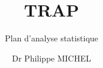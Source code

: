 \documentclass[
  a4paper,
  french]{scrreprt}
\title{TRAP}
\subtitle{Plan d'analyse statistique}
\author{Dr Philippe MICHEL}
\date{}
\begin{document}


\begin{titlepage}


\newcommand{\titlepagepagealign}{
\ifthenelse{\equal{left}{right}}{\raggedleft}{}
\ifthenelse{\equal{left}{center}}{\centering}{}
\ifthenelse{\equal{left}{left}}{\raggedright}{}
}


\newcommand{\titleandsubtitle}{
{\textcolor{novo}{\Huge{\bfseries{\nohyphens{TRAP}}}}\par
}%

\vspace{\betweentitlesubtitle}
{
\textcolor{novo}{\huge{\nohyphens{Plan d'analyse statistique}}}\par
}}
\newcommand{\titlepagetitleblock}{
\titleandsubtitle
}

\newcommand{\authorstyle}[1]{{\large{#1}}}

\newcommand{\affiliationstyle}[1]{{\large{#1}}}

\newcommand{\titlepageauthorblock}{
{\authorstyle{\nohyphens{Dr Philippe MICHEL}{\textsuperscript{1}}}}}

\newcommand{\titlepageaffiliationblock}{
\hangindent=1em
\hangafter=1
{\affiliationstyle{
{1}.~Hôpital NOVO,~Unité de Soutien à la Recherche Clinique


\vspace{1\baselineskip} 
}}
}
\newcommand{\headerstyled}{%
{}
}
\newcommand{\footerstyled}{%
{\large{\today}}
}
\newcommand{\datestyled}{%
{}
}


\newcommand{\titlepageheaderblock}{\headerstyled}

\newcommand{\titlepagefooterblock}{
\footerstyled
}

\newcommand{\titlepagedateblock}{
\datestyled
}

\newcommand{\titleblock}{\newlength{\betweentitlesubtitle}
\setlength{\betweentitlesubtitle}{\baselineskip}
{

{\titlepagetitleblock}
}

\vspace{4\baselineskip}
}

\newcommand{\authorblock}{{\titlepageauthorblock}

\vspace{2\baselineskip}
}

\newcommand{\affiliationblock}{{\titlepageaffiliationblock}

}
\end{titlepage}
\end{document}
